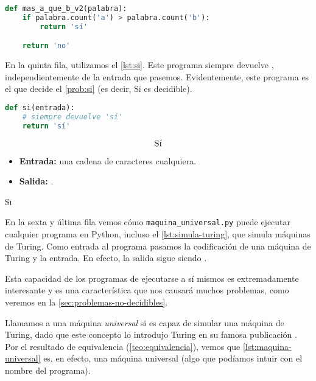 \vspace{8pt}
\begin{lstlisting}[language=Python, caption=\lstinline{mas_a_que_b_v2.py},label={lst:mas-a-que-b-v2}]
def mas_a_que_b_v2(palabra):
    if palabra.count('a') > palabra.count('b'):
        return 'sí'

    return 'no'
\end{lstlisting}

En la quinta fila, utilizamos el \cref{lst:si}. Este programa siempre devuelve , independientemente de la entrada que pasemos. Evidentemente, este programa es el que decide el \cref{prob:si} (es decir, \textsc{Sí} es decidible).\label{lab:si-decidible}
\vspace{8pt}
\begin{lstlisting}[language=Python, caption=\lstinline{si.py},label={lst:si}]
def si(entrada):
    # siempre devuelve 'sí'
    return 'sí'
\end{lstlisting}
\begin{problema}
\begin{framed}
$$\text{\textsc{Sí}}$$

\begin{itemize}
    \item \textbf{Entrada:} una cadena de caracteres cualquiera.
    \item \textbf{Salida:} .
\end{itemize}
\end{framed}
\caption{\textsc{Sí}}
\label{prob:si}
\end{problema}
En la sexta y última fila vemos cómo \texttt{maquina\_universal.py} puede ejecutar cualquier programa en Python, incluso el \cref{lst:simula-turing}, que simula máquinas de Turing. Como entrada al programa pasamos la codificación de una máquina de Turing y la entrada. En efecto, la salida sigue siendo .

Esta capacidad de los programas de ejecutarse a sí mismos es extremadamente interesante y es una característica que nos causará muchos problemas, como veremos en la \cref{sec:problemas-no-decidibles}.

\vspace{8pt}

Llamamos a una máquina \emph{universal} si es capaz de simular una máquina de Turing, dado que este concepto lo introdujo Turing en su famosa publicación \cite{Turing1937}. Por el resultado de equivalencia (\cref{teo:equivalencia}), vemos que \cref{lst:maquina-universal} es, en efecto, una máquina universal (algo que podíamos intuir con el nombre del programa).

